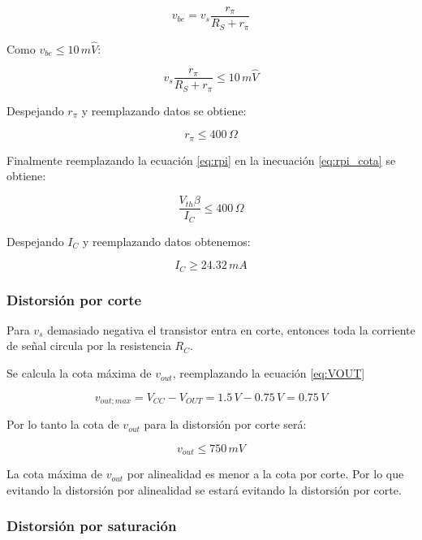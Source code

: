 \documentclass[10pt,spanish,a4paper,openany,notitlepage]{article}
\begin{document}
\[ \displaystyle v_{be} = v_s \frac{r_\pi}{R_S + r_\pi} \]

Como $v_{be} \leqslant 10\, \unit{m\widehat{V}}$:

\[ \displaystyle v_s \frac{r_\pi}{R_S + r_\pi} \leqslant 10\,\unit{m\widehat{V}}\]

Despejando $r_\pi$ y reemplazando datos se obtiene:

\begin{equation}
r_\pi \leqslant 400\, \unit{\Omega}
\label{eq:rpi_cota}
\end{equation}

Finalmente reemplazando la ecuación \ref{eq:rpi} en la inecuación \ref{eq:rpi_cota}
se obtiene:

\[ \displaystyle \frac{V_{th} \beta}{I_C} \leqslant 400\, \unit{\Omega} \]

Despejando $I_C$ y reemplazando datos obtenemos:

\begin{equation}
I_C \geqslant 24.32\, \unit{mA}
\label{eq:IC_alinealidad}
\end{equation}

\subsubsection{Distorsión por corte}

Para $v_s$ demasiado negativa el transistor entra en corte, entonces
toda la corriente de señal circula por la resistencia $R_C$.

Se calcula la cota máxima de $v_{out}$, reemplazando la ecuación \ref{eq:VOUT}

\[ \displaystyle v_{out;max} = V_{CC} - V_{OUT} = 1.5\, \unit{V} - 0.75\, \unit{V} = 0.75\, \unit{V} \]

Por lo tanto la cota de $v_{out}$ para la distorsión por corte será:

\begin{equation}
v_{out} \leqslant 750\, \unit{mV}
\label{eq:vout_corte}
\end{equation}

La cota máxima de $v_{out}$ por alinealidad es menor a la cota por corte. Por
lo que evitando la distorsión por alinealidad se estará evitando la
distorsión por corte.

\subsubsection{Distorsión por saturación}
\end{document}

